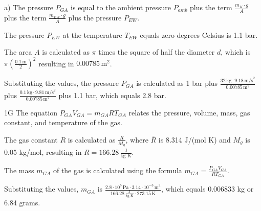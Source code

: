 a) The pressure \( P_{GA} \) is equal to the ambient pressure \( P_{amb} \) plus the term \( \frac{m_K \cdot g}{A} \) plus the term \( \frac{m_{EW} \cdot g}{A} \) plus the pressure \( P_{EW} \).

The pressure \( P_{EW} \) at the temperature \( T_{EW} \) equals zero degrees Celsius is 1.1 bar.

The area \( A \) is calculated as \( \pi \) times the square of half the diameter \( d \), which is \( \pi \left( \frac{0.1 \, \text{m}}{2} \right)^2 \) resulting in \( 0.00785 \, \text{m}^2 \).

Substituting the values, the pressure \( P_{GA} \) is calculated as 1 bar plus \( \frac{32 \, \text{kg} \cdot 9.18 \, \text{m/s}^2}{0.00785 \, \text{m}^2} \) plus \( \frac{0.1 \, \text{kg} \cdot 9.81 \, \text{m/s}^2}{0.00785 \, \text{m}^2} \) plus 1.1 bar, which equals 2.8 bar.

1G The equation \( P_{GA} V_{GA} = m_{GA} R T_{GA} \) relates the pressure, volume, mass, gas constant, and temperature of the gas.

The gas constant \( R \) is calculated as \( \frac{\bar{R}}{M_g} \), where \( \bar{R} \) is 8.314 J/(mol K) and \( M_g \) is 0.05 kg/mol, resulting in \( R = 166.28 \, \frac{\text{J}}{\text{kg K}} \).

The mass \( m_{GA} \) of the gas is calculated using the formula \( m_{GA} = \frac{P_{GA} V_{GA}}{R T_{GA}} \).

Substituting the values, \( m_{GA} \) is \( \frac{2.8 \cdot 10^5 \, \text{Pa} \cdot 3.14 \cdot 10^{-3} \, \text{m}^3}{166.28 \, \frac{\text{J}}{\text{kg K}} \cdot 273.15 \, \text{K}} \), which equals 0.006833 kg or 6.84 grams.